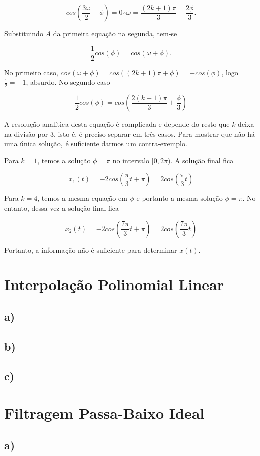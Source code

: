 \documentclass[a4paper, 12pt]{article}
\begin{document}
$$cos(\frac{3\omega}{2} + \phi)=0 \therefore \omega = \frac{(2k+1)\pi}{3} - \frac{2\phi}{3}.$$

Substituindo $A$ da primeira equação na segunda, tem-se

$$\frac{1}{2}cos(\phi)=cos(\omega + \phi).$$

No primeiro caso, $cos(\omega + \phi)=cos((2k+1)\pi + \phi)=-cos(\phi)$, logo $\frac{1}{2}=-1$, absurdo. No segundo caso

$$\frac{1}{2}cos(\phi) = cos(\frac{2(k+1)\pi}{3} + \frac{\phi}{3})$$

A resolução analítica desta equação é complicada e depende do resto que $k$ deixa na divisão por $3$, isto é, é preciso separar em três casos. Para mostrar que não há uma única solução, é suficiente darmos um contra-exemplo. 

Para $k=1$, temos a solução $\phi=\pi$ no intervalo $[0, 2\pi).$ A solução final fica

$$x_1(t)=-2cos(\frac{\pi}{3}t + \pi)=2cos(\frac{\pi}{3}t)$$

Para $k=4$, temos a mesma equação em $\phi$ e portanto a mesma solução $\phi=\pi$. No entanto, dessa vez a solução final fica

$$x_2(t)=-2cos(\frac{7\pi}{3}t + \pi)=2cos(\frac{7\pi}{3}t)$$

Portanto, a informação não é suficiente para determinar $x(t)$.

\section{Interpolação Polinomial Linear}

\subsection{a)}

\subsection{b)}

\subsection{c)}

\section{Filtragem Passa-Baixo Ideal}

\subsection{a)}
\end{document}
